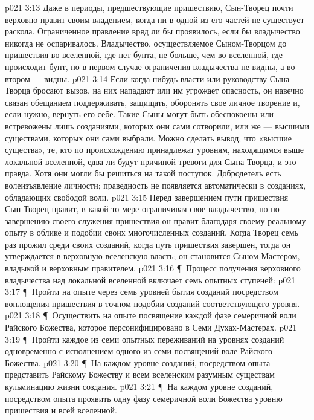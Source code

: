 \vs p021 3:13 Даже в периоды, предшествующие пришествию, Сын\hyp{}Творец почти верховно правит своим владением, когда ни в одной из его частей не существует раскола. Ограниченное правление вряд ли бы проявилось, если бы владычество никогда не оспаривалось. Владычество, осуществляемое Сыном\hyp{}Творцом до пришествия во вселенной, где нет бунта, не больше, чем во вселенной, где происходит бунт, но в первом случае ограничения владычества не видны, а во втором --- видны.
\vs p021 3:14 Если когда\hyp{}нибудь власти или руководству Сына\hyp{}Творца бросают вызов, на них нападают или им угрожает опасность, он навечно связан обещанием поддерживать, защищать, оборонять свое личное творение и, если нужно, вернуть его себе. Такие Сыны могут быть обеспокоены или встревожены лишь созданиями, которых они сами сотворили, или же --- высшими существами, которых они сами выбрали. Можно сделать вывод, что «высшие существа», те, кто по происхождению принадлежат уровням, находящимся выше локальной вселенной, едва ли будут причиной тревоги для Сына\hyp{}Творца, и это правда. Хотя они могли бы решиться на такой поступок. Добродетель есть волеизъявление личности; праведность не появляется автоматически в созданиях, обладающих свободой воли.
\vs p021 3:15 Перед завершением пути пришествия Сын\hyp{}Творец правит, в какой\hyp{}то мере ограничивая свое владычество, но по завершению своего служения\hyp{}пришествия он правит благодаря своему реальному опыту в облике и подобии своих многочисленных созданий. Когда Творец семь раз прожил среди своих созданий, когда путь пришествия завершен, тогда он утверждается в верховную вселенскую власть; он становится Сыном\hyp{}Мастером, владыкой и верховным правителем.
\vs p021 3:16 \P\ Процесс получения верховного владычества над локальной вселенной включает семь опытных ступеней:
\vs p021 3:17 \P\ \bibnobreakspace Пройти на опыте через семь уровней бытия созданий посредством воплощения\hyp{}пришествия в точном подобии созданий соответствующего уровня.
\vs p021 3:18 \P\ \bibnobreakspace Осуществить на опыте посвящение каждой фазе семеричной воли Райского Божества, которое персонифицировано в Семи Духах\hyp{}Мастерах.
\vs p021 3:19 \P\ \bibnobreakspace Пройти каждое из семи опытных переживаний на уровнях созданий одновременно с исполнением одного из семи посвящений воле Райского Божества.
\vs p021 3:20 \P\ \bibnobreakspace На каждом уровне созданий, посредством опыта представить Райскому Божеству и всем вселенским разумным существам кульминацию жизни создания.
\vs p021 3:21 \P\ \bibnobreakspace На каждом уровне созданий, посредством опыта проявить одну фазу семеричной воли Божества уровню пришествия и всей вселенной.
